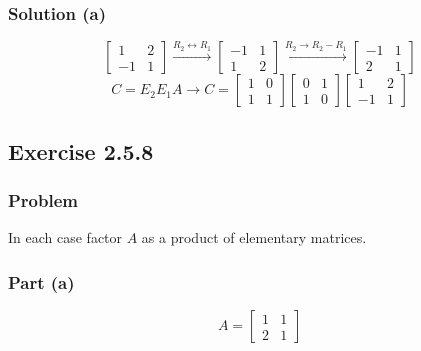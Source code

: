 \documentclass[12pt]{article}
\begin{document}
\subsubsection*{Solution (a)}
\[
  \begin{bmatrix}
    1 & 2\\ 
    -1 & 1 
  \end{bmatrix} \overset{R_2 \leftrightarrow R_1}{\longrightarrow}\begin{bmatrix}
    -1 & 1\\ 
    1 & 2 
    \end{bmatrix}\overset{R_2 \rightarrow R_2 - R_1}{\longrightarrow}\begin{bmatrix}
    -1 & 1\\ 
    2 & 1 
  \end{bmatrix}
\]
\[
  C = E_2E_1A \longrightarrow C = \begin{bmatrix}
    1 & 0\\ 
    1 & 1 
    \end{bmatrix}\begin{bmatrix}
    0 & 1\\ 
    1 & 0 
    \end{bmatrix}\begin{bmatrix}
    1 & 2\\ 
    -1 & 1 
  \end{bmatrix}
\]
\vspace{2in}
\subsection*{Exercise 2.5.8}
\subsubsection*{Problem}
In each case factor $A$ as a product of elementary matrices. 
\subsubsection*{Part (a)}
\[
  A = \begin{bmatrix}
    1 & 1\\ 
    2 & 1 
  \end{bmatrix}
\]
\end{document}
